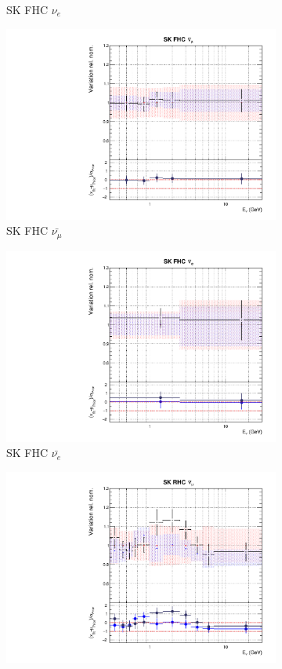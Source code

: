 \begin{figure}[t]
\begin{subfigure}{0.24\textwidth}
  \caption{SK FHC $\nu_e$}
  \label{fig:}
\end{subfigure}
\begin{subfigure}{0.24\textwidth}
  \centering
  \includegraphics[width=0.95\linewidth]{figs/rhcmpdat248flux_10}
  \caption{SK FHC $\bar{\nu_{\mu}}$}
  \label{fig:}
\end{subfigure}
\begin{subfigure}{0.24\textwidth}
  \centering
  \includegraphics[width=0.95\linewidth]{figs/rhcmpdat28flux_11}
  \caption{SK FHC $\bar{\nu_{e}}$}
  \label{fig:}
\end{subfigure}
\begin{subfigure}{0.24\textwidth}
  \centering
  \includegraphics[width=0.95\linewidth]{figs/rhcmpdat28flux_12}

\end{subfigure}
\end{figure}
